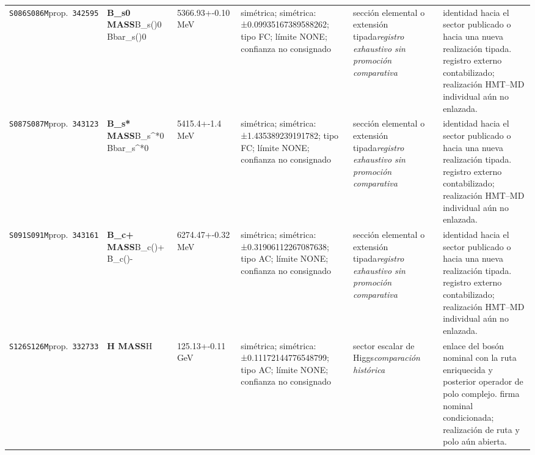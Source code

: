 \begin{landscape}
\begin{longtable}{L{1.85cm}L{4.45cm}L{2.35cm}L{4.05cm}L{3.35cm}L{7.15cm}}
\texttt{S086}\newline \texttt{S086M}\newline prop.\ \texttt{342595} & \textbf{B\_\allowbreak{}s0 MASS}\newline B\_\allowbreak{}s()0 \textbar{}\allowbreak{} Bbar\_\allowbreak{}s()0 & 5366.93+-0.10\,MeV & simétrica; simétrica: ±0.09935167389588262; tipo FC; límite NONE; confianza no consignado & sección elemental o extensión tipada\newline \emph{registro exhaustivo sin promoción comparativa} & identidad hacia el sector publicado o hacia una nueva realización tipada. registro externo contabilizado; realización HMT--MD individual aún no enlazada. \\
\texttt{S087}\newline \texttt{S087M}\newline prop.\ \texttt{343123} & \textbf{B\_\allowbreak{}s* MASS}\newline B\_\allowbreak{}s\textasciicircum{}*0 \textbar{}\allowbreak{} Bbar\_\allowbreak{}s\textasciicircum{}*0 & 5415.4+-1.4\,MeV & simétrica; simétrica: ±1.435389239191782; tipo FC; límite NONE; confianza no consignado & sección elemental o extensión tipada\newline \emph{registro exhaustivo sin promoción comparativa} & identidad hacia el sector publicado o hacia una nueva realización tipada. registro externo contabilizado; realización HMT--MD individual aún no enlazada. \\
\texttt{S091}\newline \texttt{S091M}\newline prop.\ \texttt{343161} & \textbf{B\_\allowbreak{}c+ MASS}\newline B\_\allowbreak{}c()+ \textbar{}\allowbreak{} B\_\allowbreak{}c()- & 6274.47+-0.32\,MeV & simétrica; simétrica: ±0.31906112267087638; tipo AC; límite NONE; confianza no consignado & sección elemental o extensión tipada\newline \emph{registro exhaustivo sin promoción comparativa} & identidad hacia el sector publicado o hacia una nueva realización tipada. registro externo contabilizado; realización HMT--MD individual aún no enlazada. \\
\texttt{S126}\newline \texttt{S126M}\newline prop.\ \texttt{332733} & \textbf{H MASS}\newline H & 125.13+-0.11\,GeV & simétrica; simétrica: ±0.11172144776548799; tipo AC; límite NONE; confianza no consignado & sector escalar de Higgs\newline \emph{comparación histórica} & enlace del bosón nominal con la ruta enriquecida y posterior operador de polo complejo. firma nominal condicionada; realización de ruta y polo aún abierta. \\
\end{longtable}
\endgroup
\end{landscape}
